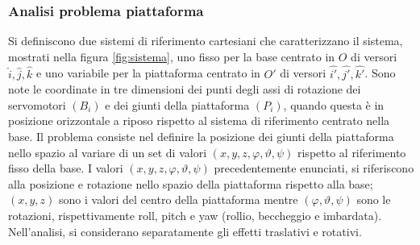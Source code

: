 \documentclass[11pt]{article}
\begin{document}
\subsubsection{Analisi problema piattaforma}

Si definiscono due sistemi di riferimento cartesiani che caratterizzano il sistema, mostrati nella figura \ref{fig:sistema}, uno fisso per la base centrato in $O$ di versori $\hat{i},\hat{j},\hat{k}$ e uno variabile per la piattaforma centrato in $O'$ di versori $\hat{i'},\hat{j'},\hat{k'}$. Sono note le coordinate in tre dimensioni dei punti degli assi di rotazione dei servomotori $({B_i})$ e dei giunti della piattaforma $(P_i)$, quando questa è in posizione orizzontale a riposo rispetto al sistema di riferimento centrato nella base. Il problema consiste nel definire la posizione dei giunti della piattaforma nello spazio al variare di un set di valori $(x,y,z,\varphi,\vartheta,\psi)$ rispetto al riferimento fisso della base. I valori $(x,y,z,\varphi,\vartheta,\psi)$ precedentemente enunciati, si riferiscono alla posizione e rotazione nello spazio della piattaforma rispetto alla base; $(x,y,z)$ sono i valori del centro della piattaforma mentre $(\varphi,\vartheta,\psi)$ sono le rotazioni, rispettivamente roll, pitch e yaw (rollio, beccheggio e imbardata). Nell'analisi, si considerano separatamente gli effetti traslativi e rotativi.
\end{document}

